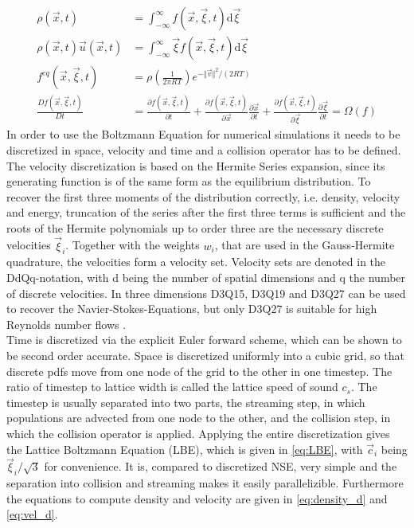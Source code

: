 \begin{align}
	\rho(\vec{x}, t) &= \int_{-\infty}^{\infty} f(\vec{x}, \vec{\xi}, t) \mathrm{d}\vec{\xi} \label{eq:rho} \\
	\rho(\vec{x}, t) \vec{u}(\vec{x}, t) &= \int_{-\infty}^{\infty} \vec{\xi} f(\vec{x}, \vec{\xi}, t) \mathrm{d}\vec{\xi} \label{eq:velocity}\\
	f^{eq} (\vec{x}, \vec{\xi}, t) &= \rho\left(\frac{1}{2 \pi RT}\right) e^{-\Vert \vec{v} \Vert^2/(2RT) } \label{eq:equilibrium} \\
	\frac{D f(\vec{x}, \vec{\xi}, t)}{Dt} &= \frac{ \partial f(\vec{x}, \vec{\xi}, t)}{\partial t} + \frac{ \partial f(\vec{x}, \vec{\xi}, t)}{\partial\vec{x}} \frac{\partial \vec{x}}{\partial t} + \frac{ \partial f(\vec{x}, \vec{\xi}, t)}{\partial \vec{\xi}} \frac{\partial \vec{\xi}}{\partial t} =  \Omega(f) \label{eq:boltzmann}
\end{align}
In order to use the Boltzmann Equation for numerical simulations it needs to be discretized in space, velocity and time and a collision operator has to be defined. \\
The velocity discretization is based on the Hermite Series expansion, since its generating function is of the same form as the equilibrium distribution. To recover the first three moments of the distribution correctly, i.e. density, velocity and energy, truncation of the series after the first three terms is sufficient and the roots of the Hermite polynomials up to order three are the necessary discrete velocities $\vec{\xi}_i$. Together with the weights $w_i$, that are used in the Gauss-Hermite quadrature, the velocities form a velocity set. Velocity sets are denoted in the DdQq-notation, with d being the number of spatial dimensions and q the number of discrete velocities. In three dimensions D3Q15, D3Q19 and D3Q27 can be used to recover the Navier-Stokes-Equations, but only D3Q27 is suitable for high Reynolds number flows \cite{kang_effect_2013}.\cite[p. 73-93]{kruger_lattice_2017} \\
Time is discretized via the explicit Euler forward scheme, which can be shown to be second order accurate. Space is discretized uniformly into a cubic grid, so that discrete pdfs move from one node of the grid to the other in one timestep. The ratio of timestep to lattice width is called the lattice speed of sound $c_s$. The timestep is usually separated into two parts, the streaming step, in which populations are advected from one node to the other, and the collision step, in which the collision operator is applied. Applying the entire discretization gives the Lattice Boltzmann Equation (LBE), which is given in \eqref{eq:LBE}, with $\vec{c}_i$ being $\vec{\xi}_i/\sqrt{3}$ for convenience. It is, compared to discretized NSE, very simple and the separation into collision and streaming makes it easily parallelizible. Furthermore the equations to compute density and velocity are given in \eqref{eq:density_d} and \eqref{eq:vel_d}. \cite[p. 94-98]{kruger_lattice_2017}\\

